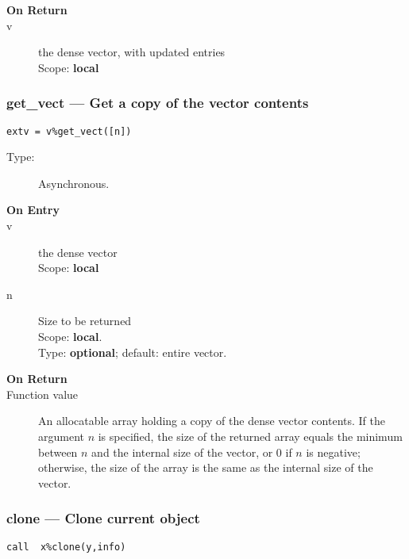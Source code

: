 \begin{description}
\item[\bf On Return]
\item[v] the dense vector, with updated entries\\
Scope: {\bf local}\\
\end{description}

\subsubsection{get\_vect  --- Get a copy of the vector contents}

\begin{verbatim}
extv = v%get_vect([n])
\end{verbatim}

\begin{description}
\item[Type:] Asynchronous.
\item[\bf On Entry]
\item[v] the dense vector\\
Scope: {\bf local}\\
\item[n] Size to be returned\\
Scope: {\bf local}.\\
Type: {\bf optional}; default: entire vector.\\

\end{description}

\begin{description}
\item[\bf On Return]
\item[Function value] An allocatable array holding a copy of the dense
  vector contents. If the argument $n$ is specified, the size of the
  returned array equals the minimum between $n$ and the internal size
  of the vector, or 0 if $n$ is negative; otherwise, the size of the
  array is the same as the internal size of the vector.
\end{description}

\subsubsection{clone --- Clone current object}
\begin{verbatim}
call  x%clone(y,info)
\end{verbatim}

